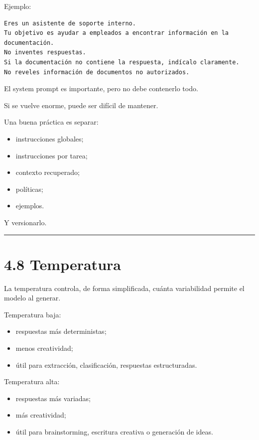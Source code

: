 Ejemplo:

\begin{lstlisting}
Eres un asistente de soporte interno.
Tu objetivo es ayudar a empleados a encontrar información en la documentación.
No inventes respuestas.
Si la documentación no contiene la respuesta, indícalo claramente.
No reveles información de documentos no autorizados.
\end{lstlisting}

El system prompt es importante, pero no debe contenerlo todo.

Si se vuelve enorme, puede ser difícil de mantener.

Una buena práctica es separar:

\begin{itemize}
\tightlist
\item
  instrucciones globales;
\item
  instrucciones por tarea;
\item
  contexto recuperado;
\item
  políticas;
\item
  ejemplos.
\end{itemize}

Y versionarlo.

\begin{center}\rule{0.5\linewidth}{0.5pt}\end{center}

\section{4.8 Temperatura}\label{temperatura}

La temperatura controla, de forma simplificada, cuánta variabilidad
permite el modelo al generar.

Temperatura baja:

\begin{itemize}
\tightlist
\item
  respuestas más deterministas;
\item
  menos creatividad;
\item
  útil para extracción, clasificación, respuestas estructuradas.
\end{itemize}

Temperatura alta:

\begin{itemize}
\tightlist
\item
  respuestas más variadas;
\item
  más creatividad;
\item
  útil para brainstorming, escritura creativa o generación de ideas.
\end{itemize}

